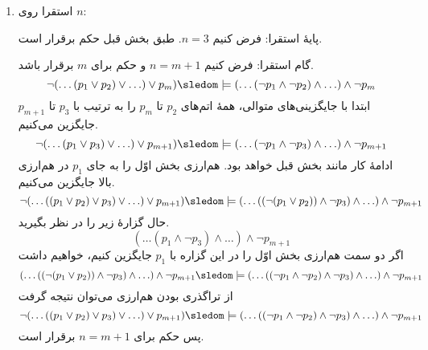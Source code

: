 \begin{ans}
\begin{enumerate}
      \item
      استقرا روی $n$:
  
      پایهٔ استقرا:
      فرض کنیم $n = 3$. طبق بخش قبل حکم برقرار است.
  
      گام استقرا:
      فرض کنیم $n = m+1$ و حکم برای $m$ برقرار باشد.
      $$\neg(\ldots(p_1\vee p_2)\vee \ldots)\vee p_m)\sledom\models (\ldots(\neg p_1\wedge \neg p_2)\wedge\ldots)\wedge\neg p_m$$
      ابتدا با جایگزینی‌های متوالی، همهٔ اتم‌های $p_2$ تا $p_m$ را به ترتیب با $p_3$ تا $p_{m+1}$ جایگزین می‌کنیم.
      $$\neg(\ldots(p_1\vee p_3)\vee \ldots)\vee p_{m+1})\sledom\models (\ldots(\neg p_1\wedge \neg p_3)\wedge\ldots)\wedge\neg p_{m+1}$$
      ادامهٔ کار مانند بخش قبل خواهد بود. هم‌ارزی بخش اوّل را به جای $p_1$ در هم‌ارزی بالا جایگزین می‌کنیم.
      $$\neg(\ldots((p_1 \vee p_2) \vee p_3)\vee \ldots)\vee p_{m+1})\sledom\models (\ldots((\neg (p_1 \vee p_2))\wedge \neg p_3)\wedge\ldots)\wedge\neg p_{m+1}$$
      حال گزارهٔ زیر را در نظر بگیرید.
      $$(\ldots(p_1\wedge \neg p_3)\wedge\ldots)\wedge\neg p_{m+1}$$
      اگر دو سمت هم‌ارزی بخش اوّل را در این گزاره با $p_1$ جایگزین کنیم، خواهیم داشت
      $$ (\ldots((\neg (p_1 \vee p_2))\wedge \neg p_3)\wedge\ldots)\wedge\neg p_{m+1} \sledom\models (\ldots((\neg p_1 \wedge \neg p_2) \wedge \neg p_3)\wedge\ldots)\wedge\neg p_{m+1}  $$
      از تراگذری بودن هم‌ارزی می‌توان نتیجه گرفت
      $$ \neg(\ldots((p_1 \vee p_2) \vee p_3)\vee \ldots)\vee p_{m+1}) \sledom\models (\ldots((\neg p_1 \wedge \neg p_2) \wedge \neg p_3)\wedge\ldots)\wedge\neg p_{m+1}  $$
      پس حکم برای $n = m+1$ برقرار است.
    \end{enumerate}
  \end{ans}
  
